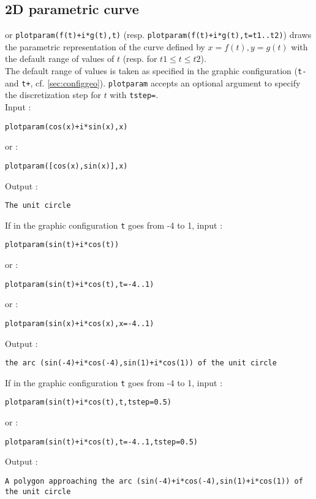 \documentclass[a4paper,11pt]{book}
\begin{document}
\subsection{2D parametric curve }
or {\tt plotparam(f(t)+i*g(t),t)} (resp. 
{\tt plotparam(f(t)+i*g(t),t=t1..t2)})
draws the parametric representation of the curve 
defined by  $x=f(t),y=g(t)$ 
with the default range of values of $t$ (resp. for $t1 \leq t\leq t2$).\\
The default range of values is taken as specified 
in the graphic configuration ({\tt t-} and {\tt t+}, 
cf. \ref{sec:configgeo}).
{\tt plotparam} accepts an optional argument to specify the discretization
step for $t$ with {\tt tstep=}.\\ 
Input :
\begin{center}{\tt plotparam(cos(x)+i*sin(x),x) }\end{center}
or :
\begin{center}{\tt plotparam([cos(x),sin(x)],x) }\end{center}
Output :
\begin{center}{\tt The unit circle}\end{center}
If in the graphic configuration {\tt t} goes from -4 to 1, input :
\begin{center}{\tt plotparam(sin(t)+i*cos(t))}\end{center}
or :
\begin{center}{\tt plotparam(sin(t)+i*cos(t),t=-4..1) }\end{center}
or :
\begin{center}{\tt plotparam(sin(x)+i*cos(x),x=-4..1) }\end{center}
Output :
\begin{center}{\tt the arc (sin(-4)+i*cos(-4),sin(1)+i*cos(1)) of the unit circle}\end{center}
If in the graphic configuration {\tt t} goes from -4 to 1, input :
\begin{center}{\tt plotparam(sin(t)+i*cos(t),t,tstep=0.5)}\end{center}
or :
\begin{center}{\tt plotparam(sin(t)+i*cos(t),t=-4..1,tstep=0.5)}\end{center}
Output :
\begin{center}{\tt A polygon approaching the arc (sin(-4)+i*cos(-4),sin(1)+i*cos(1)) of the unit circle}\end{center}
\end{document}
